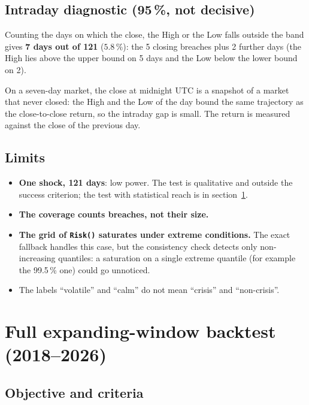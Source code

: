 \documentclass[12pt,a4paper]{article}
\begin{document}
\subsection{Intraday diagnostic (95\,\%, not decisive)}

Counting the days on which the close, the High or the Low falls outside the band gives \textbf{7 days out of 121} ($5.8\,\%$): the 5 closing breaches plus 2 further days (the High lies above the upper bound on 5 days and the Low below the lower bound on 2).

On a seven-day market, the close at midnight UTC is a snapshot of a market that never closed: the High and the Low of the day bound the same trajectory as the close-to-close return, so the intraday gap is small. The return is measured against the close of the previous day.

\subsection{Limits}

\begin{itemize}
	\item \textbf{One shock, 121 days}: low power. The test is qualitative and outside the success criterion; the test with statistical reach is in section~\ref{sec:backtest}.
	\item \textbf{The coverage counts breaches, not their size.}
	\item \textbf{The grid of \texttt{Risk()} saturates under extreme conditions.} The exact fallback handles this case, but the consistency check detects only non-increasing quantiles: a saturation on a single extreme quantile (for example the 99.5\,\% one) could go unnoticed.
	\item The labels ``volatile'' and ``calm'' do not mean ``crisis'' and ``non-crisis''.
\end{itemize}


\section{Full expanding-window backtest (2018--2026)}
\label{sec:backtest}

\subsection{Objective and criteria}
\end{document}
